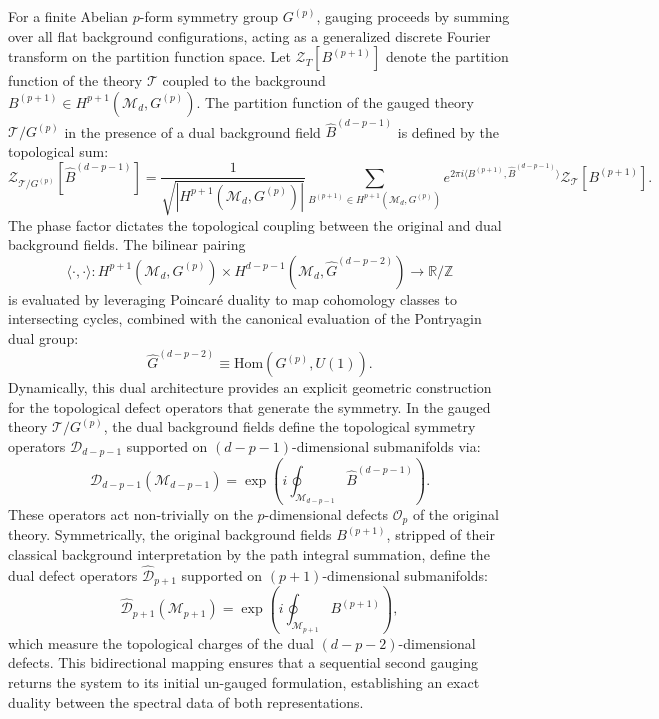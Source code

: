 \documentclass[aps,preprint,nofootinbib,preprintnumbers,eqsecnum,superscriptaddress]{revtex4}
\numberwithin{equation}{section}
\begin{document}
For a finite Abelian $p$-form symmetry group $G^{(p)}$, gauging proceeds by summing over all flat background configurations, acting as a generalized discrete Fourier transform on the partition function space. Let $\mathcal{Z}_T[B^{(p+1)}]$ denote the partition function of the theory $\mathcal{T}$ coupled to the background $B^{(p+1)} \in H^{p+1}(\mathcal{M}_d, G^{(p)})$. The partition function of the gauged theory $\mathcal{T} / G^{(p)}$ in the presence of a dual background field $\hat{B}^{(d-p-1)}$ is defined by the topological sum:
\begin{equation}
\mathcal{Z}_{\mathcal{T}/G^{(p)}}[\hat{B}^{(d-p-1)}] = \frac{1}{\sqrt{|H^{p+1}(\mathcal{M}_d, G^{(p)})|}} \sum_{B^{(p+1)} \in H^{p+1}(\mathcal{M}_d, G^{(p)})} e^{2\pi i \langle B^{(p+1)}, \hat{B}^{(d-p-1)} \rangle} \mathcal{Z}_\mathcal{T}[B^{(p+1)}].
\end{equation}
The phase factor dictates the topological coupling between the original and dual background fields. The bilinear pairing
\begin{equation}
\langle \cdot, \cdot \rangle: H^{p+1}(\mathcal{M}_d, G^{(p)}) \times H^{d-p-1}(\mathcal{M}_d, \hat{G}^{(d-p-2)}) \longrightarrow \mathbb{R}/\mathbb{Z}
\end{equation}
is evaluated by leveraging Poincaré duality to map cohomology classes to intersecting cycles, combined with the canonical evaluation of the Pontryagin dual group:
\begin{equation}
\hat{G}^{(d-p-2)} \equiv \text{Hom}(G^{(p)}, U(1)).
\end{equation}
Dynamically, this dual architecture provides an explicit geometric construction for the topological defect operators that generate the symmetry. In the gauged theory $\mathcal{T}/G^{(p)}$, the dual background fields define the topological symmetry operators $\mathcal{D}_{d-p-1}$ supported on $(d-p-1)$-dimensional submanifolds via:
\begin{equation}
\mathcal{D}_{d-p-1}(\mathcal{M}_{d-p-1}) = \exp \left( i \oint_{\mathcal{M}_{d-p-1}} \hat{B}^{(d-p-1)} \right).
\end{equation}
These operators act non-trivially on the $p$-dimensional defects $\mathcal{O}_p$ of the original theory. Symmetrically, the original background fields $B^{(p+1)}$, stripped of their classical background interpretation by the path integral summation, define the dual defect operators $\hat{\mathcal{D}}_{p+1}$ supported on $(p+1)$-dimensional submanifolds:
\begin{equation}
\hat{\mathcal{D}}_{p+1}(\mathcal{M}_{p+1}) = \exp \left( i \oint_{\mathcal{M}_{p+1}} B^{(p+1)} \right),
\end{equation}
which measure the topological charges of the dual $(d-p-2)$-dimensional defects. This bidirectional mapping ensures that a sequential second gauging returns the system to its initial un-gauged formulation, establishing an exact duality between the spectral data of both representations.
\end{document}
